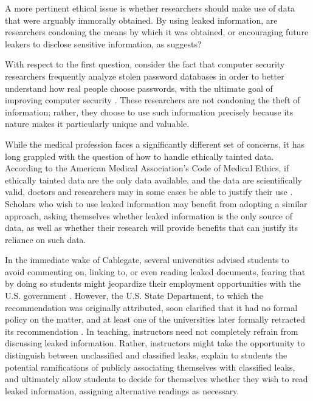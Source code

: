 \documentclass[12pt]{article}
\begin{document}
A more pertinent ethical issue is whether researchers should make use of data that were arguably 
immorally obtained. By using leaked information, are researchers condoning the means by which it was 
obtained, or encouraging future leakers to disclose sensitive information, as \citet{conway2013why} suggests?

With respect to the first question, consider the fact that computer security researchers frequently 
analyze stolen password databases in order to 
better understand how real people choose passwords, with the ultimate goal of improving computer 
security \citep{imperva2010imperva,bbc2013`123456}.
These researchers are not condoning the theft of information; rather, 
they choose to use such information precisely because its nature makes it particularly unique and 
valuable. 

While the medical profession faces a significantly different set of concerns, it has long 
grappled with the question of how to handle ethically tainted data. According to the American Medical Association's 
Code of Medical Ethics, if ethically tainted data are the only data available, and the data are scientifically 
valid, doctors and researchers may in some cases be able to justify their 
use \citep{american_medical_association1998opinion}. Scholars who wish to use leaked information may benefit from adopting a similar approach, asking themselves whether leaked information is the only source of data, as well as whether their research will provide benefits that can justify its reliance on such data. 

In the immediate wake of Cablegate, several universities advised students to avoid commenting on, linking to, 
or even reading leaked documents, 
fearing that by doing so students might jeopardize their employment opportunities with the U.S. 
government \citep{emanuella_grinberg2010will}. However, the U.S. State Department, to which the recommendation 
was originally attributed, soon clarified that it had no formal policy on the matter, and at least one of the 
universities later formally retracted its recommendation \citep{gustin2010columbia}.
In teaching, instructors need not completely refrain from discussing leaked information. Rather, instructors 
might take the opportunity to distinguish between unclassified and classified leaks, explain to 
students the potential ramifications of publicly associating themselves with classified leaks, and 
ultimately allow students to decide for themselves whether they wish to read leaked information, assigning alternative 
readings as necessary.
\end{document}
